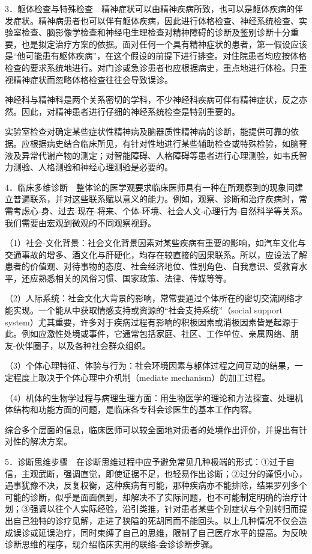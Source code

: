 3．躯体检查与特殊检查　精神症状可以由精神疾病所致，也可以是躯体疾病的伴发症状。精神病患者也可以伴有躯体疾病，因此进行体格检查、神经系统检查、实验室检查、脑影像学检查和神经电生理检查对精神障碍的诊断及鉴别诊断十分重要，也是拟定治疗方案的依据。面对任何一个具有精神症状的患者，第一假设应该是``他可能患有躯体疾病''，在这个假设的前提下进行排查。对住院患者均应按体格检查的要求系统地进行。对门诊或急诊患者也应根据病史，重点地进行体检。只重视精神症状而忽略体格检查往往会导致误诊。

神经科与精神科是两个关系密切的学科，不少神经科疾病可伴有精神症状，反之亦然。因此，对精神患者进行仔细的神经系统检查是特别重要的。

实验室检查对确定某些症状性精神病及脑器质性精神病的诊断，能提供可靠的依据。应根据病史结合临床所见，有针对性地进行某些辅助检查或特殊检验，如脑脊液及异常代谢产物的测定；对智能障碍、人格障碍等患者进行心理测验，如韦氏智力测验、人格测验和神经心理测验是必要的。

4．临床多维诊断　整体论的医学观要求临床医师具有一种在所观察到的现象间建立普遍联系，并对这些联系赋以意义的能力。例如，观察、诊断和治疗疾病时，常需考虑心-身、过去-现在-将来、个体-环境、社会人文-心理行为-自然科学等关系。我们需要由宏观到微观的不同观察视野。

（1）社会-文化背景：社会文化背景因素对某些疾病有重要的影响，如汽车文化与交通事故的增多、酒文化与肝硬化，均存在较直接的因果联系。所以，应设法了解患者的价值观、对待事物的态度、社会经济地位、性别角色、自我意识、受教育水平，还应熟悉相关的风俗习惯、国家政策、法律、传媒等等。

（2）人际系统：社会文化大背景的影响，常常要通过个体所在的密切交流网络才能实现。一个能从中获取情感支持或资源的``社会支持系统''（social
support
system）尤其重要，许多对于疾病过程有影响的积极因素或消极因素皆是起源于此。例如应激性处境或事件，它通常包括家庭、社区、工作单位、亲属网络、朋友-伙伴圈子，以及各种社会群众组织。

（3）个体心理特征、体验与行为：社会环境因素与躯体过程之间互动的结果，一定程度上取决于个体心理中介机制（mediate
mechanism）的加工过程。

（4）机体的生物学过程与病理生理方面：用生物医学的理论和方法探查、处理机体结构和功能方面的问题，是临床各专科会诊医生的基本工作内容。

综合多个层面的信息，临床医师可以较全面地对患者的处境作出评价，并提出有针对性的解决方案。

5．诊断思维步骤　在诊断思维过程中应予避免常见几种极端的形式：①过于自信，主观武断，强调直觉，即使证据不足，也轻易作出诊断；②过分的谨慎小心，遇事犹豫不决，反复权衡，这种疾病有可能，那种疾病亦不能排除，结果罗列多个可能的诊断，似乎是面面俱到，却解决不了实际问题，也不可能制定明确的治疗计划；③强调以往个人实际经验，沿引类推，针对患者某些个别症状与个别转归而提出自己独特的诊疗见解，走进了狭隘的死胡同而不能回头。以上几种情况不仅会造成误诊或延误治疗，同时束缚了自己的思维，限制了自己医疗水平的提高。为反映诊断思维的程序，现介绍临床实用的联络-会诊诊断步骤。

